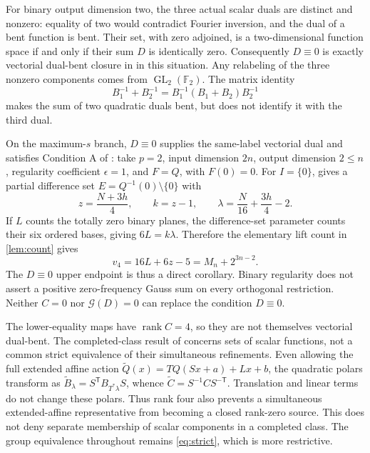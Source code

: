 \documentclass[11pt,a4paper]{article}
\theoremstyle{definition}
\theoremstyle{remark}
\numberwithin{equation}{section}
\newcommand{\F}{\mathbb F}
\newcommand{\GL}{\operatorname{GL}}
\newcommand{\Gauss}{\mathcal G}
\newcommand{\vfour}{v_4}
\begin{document}
For binary output dimension two, the three actual scalar duals are
distinct and nonzero: equality of two would contradict Fourier
inversion, and the dual of a bent function is bent. Their set, with
zero adjoined, is a two-dimensional function space if and only if their
sum \(D\) is identically zero. Consequently \(D\equiv0\) is exactly
vectorial dual-bent closure in \citep[Definition 1, p.~309]{CMP18} in
this situation. Any relabeling of the three nonzero components comes
from \(\GL_2(\F_2)\). The matrix identity
\[
 B_1^{-1}+B_2^{-1}=B_1^{-1}(B_1+B_2)B_2^{-1}
\]
makes the sum of two quadratic duals bent, but does not identify it
with the third dual.

On the maximum-\(s\) branch, \(D\equiv0\) supplies the same-label
vectorial dual and satisfies Condition A of \citep[p.~9]{WFW23}:
take \(p=2\), input dimension \(2n\), output dimension \(2\leq n\),
regularity coefficient \(\epsilon=1\), and \(F=Q\), with \(F(0)=0\).
For \(I=\{0\}\), \citep[Theorem 6, equation (35), pp.~23--24]{WFW23}
gives a partial difference set \(E=Q^{-1}(0)\setminus\{0\}\) with
\[
 z=\frac{N+3h}{4},\qquad k=z-1,\qquad
 \lambda=\frac N{16}+\frac{3h}{4}-2.
\]
If \(L\) counts the totally zero binary planes, the difference-set
parameter counts their six ordered bases, giving \(6L=k\lambda\).
Therefore the elementary lift count in \cref{lem:count} gives
\[
 \vfour=16L+6z-5=M_n+2^{3n-2}.
\]
The \(D\equiv0\) upper endpoint is thus a direct corollary. Binary
regularity does not assert a positive zero-frequency Gauss sum on
every orthogonal restriction. Neither \(C=0\) nor \(\Gauss(D)=0\)
can replace the condition \(D\equiv0\).

The lower-equality maps have \(\operatorname{rank}C=4\), so they are
not themselves vectorial dual-bent. The completed-class result of
\citep[Theorem 1, p.~311]{CMP18} concerns sets of scalar functions,
not a common strict equivalence of their simultaneous refinements.
Even allowing the full extended affine action
\(\widetilde Q(x)=TQ(Sx+a)+Lx+b\), the quadratic polars transform as
\(\widetilde B_\lambda=S^{\mathsf T}B_{T^*\lambda}S\), whence
\(\widetilde C=S^{-1}CS^{-\mathsf T}\). Translation and linear terms
do not change these polars. Thus rank four also prevents a simultaneous
extended-affine representative from becoming a closed rank-zero source.
This does not deny separate membership of scalar components in a
completed class. The group equivalence throughout remains
\eqref{eq:strict}, which is more restrictive.
\end{document}
